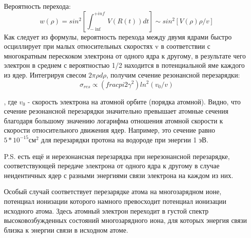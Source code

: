 \documentclass[10pt, a4paper]{article}
\begin{document}
\begin{figure}[h!]
\end{figure}
 Вероятность перехода:
\begin{equation}
w(\rho)=sin^{2}[ \int_{-\inf}^{+inf} V(R(t))dt] \sim sin^{2}[V(\rho)\rho/v]
\end{equation}
Как следует из формулы, вероятность перехода между двумя ядрами быстро осциллирует при малых относительных скоростях v в соответствии с многократным перескоком электрона от одного ядра к другому, в результате чего электрон в среднем с вероятностью 1/2  находится в потенциальной яме каждого из ядер. Интегрируя свесом $2\pi\rho d\rho$, получим сечение резонансной перезарядки:
\begin{equation}
\sigma_{res}\propto(frac{pi}{2\gamma^{2}})ln^{2}(v_0/v)
\end{equation}

, где $v_0$ - скорость электрона на атомной орбите (порядка атомной). Видно, что сечение резонансной перезарядки значительно превышает атомные сечения благодаря большому значению логарифма  отношения атомной скорости к скорости относительного движения ядер.  Например, это сечение равно $5*10^{-15} см^{2}$ для перезарядки протона на водороде при энергии 1 эВ.

P.S. есть ещё и нерезонансная перезарядка при нерезонансной перезарядке, соответствующей передаче электрона от одного ядра к другому в случае неидентичных ядер с разными энергиями 
связи электрона на каждом из них.

Особый случай соответствует перезарядке атома на многозарядном ионе, потенциал ионизации которого намного превосходит потенциал ионизации исходного атома. Здесь атомный электрон переходит в густой спектр высоковозбужденных состояний многозарядного иона, для которых энергия связи близка к энергии связи в исходном атоме.
\begin{figure}[h!]
\end{figure}
\end{document}
